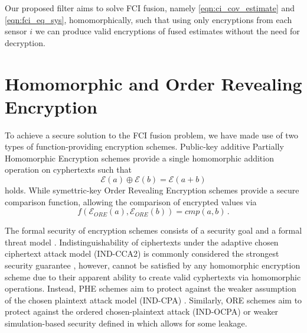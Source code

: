\documentclass[letterpaper, 10 pt, conference]{ieeeconf}  %
\begin{document}
Our proposed filter aims to solve FCI fusion, namely \eqref{eqn:ci_cov_estimate} and \eqref{eqn:fci_eq_sys}, homomorphically, such that using only encryptions from each sensor $i$ we can produce valid encryptions of fused estimates without the need for decryption.




\section{Homomorphic and Order Revealing Encryption} \label{sec:encryption}
To achieve a secure solution to the FCI fusion problem, we have made use of two types of function-providing encryption schemes. Public-key additive Partially Homomorphic Encryption schemes \cite{paillierPublicKeyCryptosystemsBased1999,goldwasserProbabilisticEncryption1984a} provide a single homomorphic addition operation on cyphertexts such that
\begin{equation}
   \mathcal{E}(a) \oplus \mathcal{E}(b) = \mathcal{E}(a+b) \label{eqn:phe_eq}
\end{equation}
holds. While symettric-key Order Revealing Encryption schemes \cite{chenettePracticalOrderRevealingEncryption2016,lewiOrderRevealingEncryptionNew2016} provide a secure comparison function, allowing the comparison of encrypted values via
\begin{equation}
   f(\mathcal{E}_{ORE}(a), \mathcal{E}_{ORE}(b)) = cmp(a, b)\,. \label{eqn:ore_eq}
\end{equation}

The formal security of encryption schemes consists of a security goal and a formal threat model \cite{katzIntroductionModernCryptography2007}. Indistinguishability of ciphertexts under the adaptive chosen ciphertext attack model (IND-CCA2) is commonly considered the strongest security guarantee \cite{bellareRelationsNotionsSecurity1998}, however, cannot be satisfied by any homomorphic encryption scheme due to their apparent ability to create valid cyphertexts via homomorphic operations. Instead, PHE schemes aim to protect against the weaker assumption of the chosen plaintext attack model (IND-CPA) \cite{chaseSECURITYHOMOMORPHICENCRYPTION}. Similarly, ORE schemes aim to protect against the ordered chosen-plaintext attack (IND-OCPA) or weaker simulation-based security defined in \cite{chenettePracticalOrderRevealingEncryption2016} which allows for some leakage.
\end{document}
